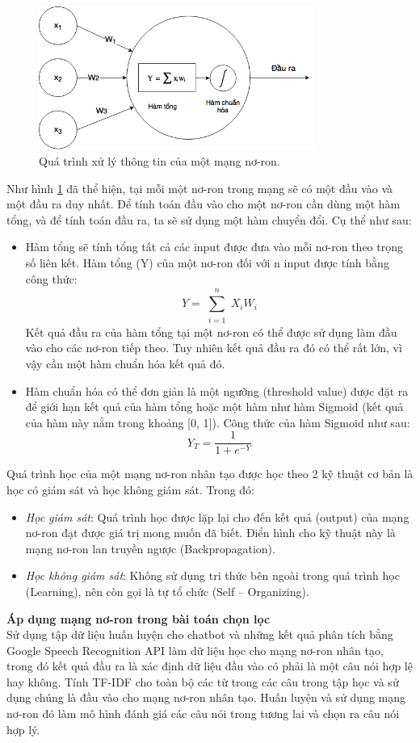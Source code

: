 \documentclass[12pt]{report}
\begin{document}
\begin{figure}[H]
	\centering
	\includegraphics[width=9cm]{Pics/Chap5/ann-neural.png}
	\caption{Quá trình xử lý thông tin của một mạng nơ-ron.}
	\label{fig:ann-infoprocess}
\end{figure}

Như hình \ref{fig:ann-infoprocess} đã thể hiện, tại mỗi một nơ-ron trong mạng sẽ có một đầu vào và một đầu ra duy nhất. Để tính toán đầu vào cho một nơ-ron cần dùng một hàm tổng, và để tính toán đầu ra, ta sẽ sử dụng một hàm chuyển đổi. Cụ thể như sau:

\begin{itemize}
	\item Hàm tổng sẽ tính tổng tất cả các input được đưa vào mỗi nơ-ron theo trọng số liên kết. Hàm tổng (Y) của một nơ-ron đối với n input được tính bằng công thức:
	\[Y = \sum_{\substack{i=1}}^{\substack{n}}{X_iW_i}\]
	Kết quả đầu ra của hàm tổng tại một nơ-ron có thể được sử dụng làm đầu vào cho các nơ-ron tiếp theo. Tuy nhiên kết quả đầu ra đó có thể rất lớn, vì vậy cần một hàm chuẩn hóa kết quả đó.
	\item Hàm chuẩn hóa có thể đơn giản là một ngưỡng (threshold value) được đặt ra để giới hạn kết quả của hàm tổng hoặc một hàm như hàm Sigmoid (kết quả của hàm này nằm trong khoảng [0, 1]). Công thức của hàm Sigmoid như sau:
	\[Y_T = \frac{1}{1 + e^{-Y}}\]
\end{itemize}

Quá trình học của một mạng nơ-ron nhân tạo được học theo 2 kỹ thuật cơ bản là học có giám sát và học không giám sát. Trong đó:

\begin{itemize}
	\item \textit{Học giám sát}: Quá trình học được lặp lại cho đến kết quả (output) của mạng nơ-ron đạt được giá trị mong muốn đã biết. Điển hình cho kỹ thuật này là mạng nơ-ron lan truyền ngược (Backpropagation).
 	\item \textit{Học không giám sát}: Không sử dụng tri thức bên ngoài trong quá trình học (Learning), nên còn gọi là tự tổ chức (Self – Organizing).
\end{itemize}
\textbf{Áp dụng mạng nơ-ron trong bài toán chọn lọc\\[0.3cm]}
Sử dụng tập dữ liệu huấn luyện cho chatbot và những kết quả phân tích bằng Google Speech Recognition API làm dữ liệu học cho mạng nơ-ron nhân tạo, trong đó kết quả đầu ra là xác định dữ liệu đầu vào có phải là một câu nói hợp lệ hay không. Tính TF-IDF cho toàn bộ các từ trong các câu trong tập học và sử dụng chúng là đầu vào cho mạng nơ-ron nhân tạo. Huấn luyện và sử dụng mạng nơ-ron đó làm mô hình đánh giá các câu nói trong tương lai và chọn ra câu nói hợp lý.
\end{document}
